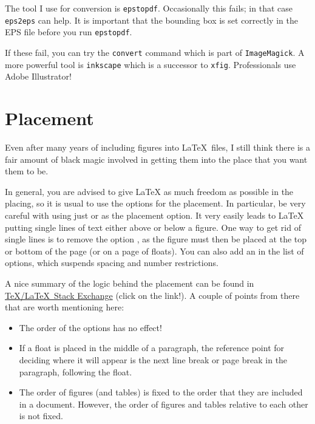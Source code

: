The tool I use for conversion is \texttt{epstopdf}. Occasionally this
fails; in that case \texttt{eps2eps} can help. It is important that
the bounding box is set correctly in the EPS file before you run
\texttt{epstopdf}.

If these fail, you can try the \texttt{convert} command which is part
of \texttt{ImageMagick}. A more powerful tool is \texttt{inkscape}
which is a successor to \texttt{xfig}. Professionals use Adobe Illustrator!


\section{Placement}%
\label{sec:fig:placement}

Even after many years of including figures into \LaTeX\ files, I
still think there is a fair amount of black magic involved in getting
them into the place that you want them to be.

In general, you are advised to give \LaTeX{} as much freedom as
possible in the placing, so it is usual to use the options
\Option{[htbp]} for the placement.
In particular, be very careful with
using just \Option{[h]} or \Option{[H]} as the placement option. It very
easily leads to \LaTeX{} putting single lines of text either above or
below a figure.
One way to get rid of single lines is to remove the option ,
as the figure must then be placed at the top or bottom of the page
(or on a page of floats).
You can also add an \Option{!} in the list
of options, which suspends spacing and number restrictions.

A nice summary of the logic behind the placement can be found in
\href{http://tex.stackexchange.com/questions/39017/how-to-influence-the-position-of-float-environments-like-figure-and-table-in-lat}{\TeX/\LaTeX\ Stack Exchange} (click on the link!).
A couple of points from there that are worth mentioning here:
\begin{itemize}
\item The order of the options  has no effect!
\item If a float is placed in the middle of a paragraph,
  the reference point for deciding where it will appear is the next line break or page break in the paragraph,
  following the float.
\item The order of figures (and tables) is fixed to the order that they are included in a document.
  However, the order of figures and tables relative to each other is not fixed.
\end{itemize}

